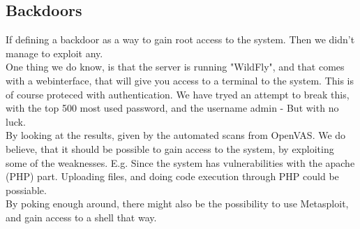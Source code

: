 \subsection{Backdoors}

If defining a backdoor as a way to gain root access to the system. Then we didn't manage to exploit any. \\
One thing we do know, is that the server is running "WildFly", and that comes with a webinterface, that will give you access to a terminal to the system. This is of course proteced with  authentication. We have tryed an attempt to break this, with the top 500 most used password, and the username admin - But with no luck. \\

By looking at the results, given by the automated scans from OpenVAS. We do believe, that it should be possible to gain access to the system, by exploiting some of the weaknesses. E.g. Since the system has vulnerabilities with the apache (PHP) part. Uploading files, and doing code execution through PHP could be possiable.\\
By poking enough around, there might also be the possibility to use Metasploit, and gain access to a shell that way.